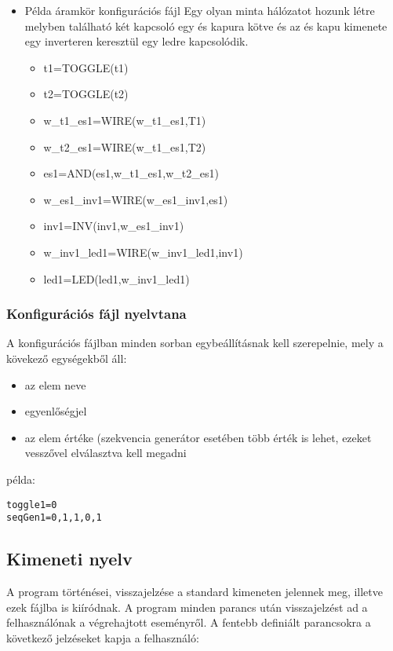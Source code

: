 \begin{itemize}
\item Példa áramkör konfigurációs fájl
Egy olyan minta hálózatot hozunk létre melyben található két kapcsoló egy és kapura kötve és az és kapu kimenete egy inverteren keresztül egy ledre kapcsolódik.
	\begin{itemize}
	\item t1=TOGGLE(t1)
	\item t2=TOGGLE(t2)
	\item w\_t1\_es1=WIRE(w\_t1\_es1,T1)
	\item w\_t2\_es1=WIRE(w\_t1\_es1,T2)
	\item es1=AND(es1,w\_t1\_es1,w\_t2\_es1)	
	\item w\_es1\_inv1=WIRE(w\_es1\_inv1,es1)	
	\item inv1=INV(inv1,w\_es1\_inv1)
	\item w\_inv1\_led1=WIRE(w\_inv1\_led1,inv1)
	\item led1=LED(led1,w\_inv1\_led1)
	\end{itemize}	


\end{itemize}

\subsubsection{Konfigurációs fájl nyelvtana}

A konfigurációs fájlban minden sorban egybeállításnak kell szerepelnie, mely a kövekező egységekből áll:
\begin{itemize}
	\item az elem neve
	\item egyenlőségjel
	\item az elem értéke (szekvencia generátor esetében több érték is lehet, ezeket vesszővel elválasztva kell megadni
\end{itemize}

példa:
\begin{verbatim}
toggle1=0
seqGen1=0,1,1,0,1
\end{verbatim}

\subsection{Kimeneti nyelv}

A program történései, visszajelzése a standard kimeneten jelennek meg, illetve ezek fájlba is kiíródnak. A program minden parancs után visszajelzést ad a felhasználónak a végrehajtott eseményről. A fentebb definiált parancsokra a következő jelzéseket kapja a felhasználó:\newline

